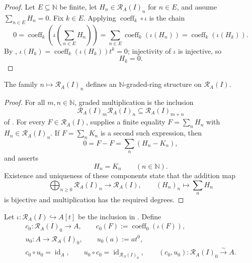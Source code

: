 \begin{proof}
  Let $E\subseteq\mathbb N$ be finite, let
  $H_n\in\mathcal R_A(I)_n$ for $n\in E$, and assume
  $\sum_{n\in E}H_n=0$.  Fix $k\in E$.  Applying
  $\operatorname{coeff}_k\circ\iota$ is the chain
  \[
    0
      =\operatorname{coeff}_k\!\left(\iota\!\left(
          \sum_{n\in E}H_n\right)\right)
      =\sum_{n\in E}\operatorname{coeff}_k(\iota(H_n))
      =\operatorname{coeff}_k(\iota(H_k)).
  \]
  By ,
  $\iota(H_k)=\operatorname{coeff}_k(\iota(H_k))t^k=0$; injectivity of
  $\iota$ is injective, so
  \[
    H_k=0.
  \]
\end{proof}

\begin{proposition}
  \label{prop:nagata-rees-graded}

  The family $n\mapsto\mathcal R_A(I)_n$ defines an
  $\mathbb N$-graded-ring structure on $\mathcal R_A(I)$.
\end{proposition}

\begin{proof}
  For all $m,n\in\mathbb N$, graded multiplication is the inclusion
  \[
    \mathcal R_A(I)_m\mathcal R_A(I)_n
      \subseteq\mathcal R_A(I)_{m+n}
  \]
  of .  For every
  $F\in\mathcal R_A(I)$,  supplies a
  finite equality $F=\sum_nH_n$ with
  $H_n\in\mathcal R_A(I)_n$.  If $F=\sum_nK_n$ is a second such expression,
  then
  \[
    0=F-F=\sum_n(H_n-K_n),
  \]
  and  asserts
  \[
    H_n=K_n\qquad(n\in\mathbb N).
  \]
  Existence and uniqueness of these components state that the addition map
  \[
    \bigoplus_{n\ge0}\mathcal R_A(I)_n\longrightarrow\mathcal R_A(I),
    \qquad (H_n)_n\longmapsto\sum_nH_n
  \]
  is bijective and multiplication has the required degrees.
\end{proof}

\begin{lemma}
  \label{lemma:nagata-rees-degree-zero}

  Let $\iota\colon\mathcal R_A(I)\hookrightarrow A[t]$ be the inclusion in
  .  Define
  \[
  \begin{gathered}
    c_0\colon\mathcal R_A(I)_0\to A,\qquad
      c_0(F):=\operatorname{coeff}_0(\iota(F)),\\
    u_0\colon A\to\mathcal R_A(I)_0,\qquad u_0(a):=at^0,\\
    c_0\circ u_0=\operatorname{id}_A,\qquad
    u_0\circ c_0=\operatorname{id}_{\mathcal R_A(I)_0},\qquad
    (c_0,u_0)\colon\mathcal R_A(I)_0\xrightarrow{\sim}A.
  \end{gathered}                                                    \tag{RZ0}
  \]
\end{lemma}

